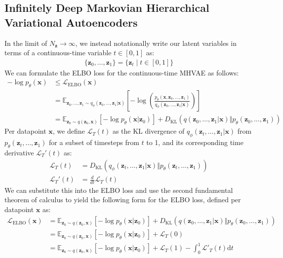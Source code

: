 \documentclass[ oneside,%
                    author={George Herbert},
                    degree={MSci},
                     title={Diffusion Models for Time-Evolving Precipitation Fields},
                  subtitle={}]{dissertation}
\begin{document}
\subsection{Infinitely Deep Markovian Hierarchical Variational Autoencoders}
\label{sec:background_vae_infinite}

In the limit of $N_\mathbf{z}\to\infty$, we instead notationally write our latent variables in terms of a continuous-time variable $t\in[0,1]$ as:
\begin{align}
      \{\mathbf{z}_0,\ldots,\mathbf{z}_1\}=\{\mathbf{z}_t\mid t\in[0,1]\}
\end{align}
We can formulate the ELBO loss for the continuous-time MHVAE as follows:
\begin{align}
      -\log p_\theta(\mathbf{x})&\le \mathcal{L}_{\mathrm{ELBO}}(\mathbf{x})\\
      &=\mathbb{E}_{\mathbf{z}_0,\ldots,\mathbf{z}_1\sim q_\phi(\mathbf{z}_0,\ldots,\mathbf{z}_1|\mathbf{x})}\left[-\log\left(\frac{p_\theta(\mathbf{x},\mathbf{z}_0,\ldots,\mathbf{z}_1)}{q_\phi(\mathbf{z}_0,\ldots,\mathbf{z}_1|\mathbf{x})}\right) \right]\\
      &=\mathbb{E}_{\mathbf{z}_0\sim q(\mathbf{z}_0,\mathbf{x})}\left[-\log p_\theta(\mathbf{x}|\mathbf{z}_0)\right]+D_{\mathrm{KL}}(q(\mathbf{z}_0,\ldots,\mathbf{z}_1|\mathbf{x})\Vert p_\theta (\mathbf{z}_0,\ldots,\mathbf{z}_1))
\end{align}
Per datapoint $\mathbf{x}$, we define $\mathcal{L}_T(t)$ as the KL divergence of $q_\phi(\mathbf{z}_t,\ldots,\mathbf{z}_1|\mathbf{x})$ from $p_\theta(\mathbf{z}_t,\ldots,\mathbf{z}_1)$ for a subset of timesteps from $t$ to 1, and its corresponding time derivative $\mathcal{L}_T'(t)$ as:
\begin{align}
      \mathcal{L}_T(t)&=D_{\mathrm{KL}}(q_\phi(\mathbf{z}_t,\ldots,\mathbf{z}_1|\mathbf{x})\Vert p_\theta(\mathbf{z}_t,\ldots,\mathbf{z}_1))\label{eq:dkl_t}\\
      \mathcal{L}_T'(t)&=\frac{d}{dt}\mathcal{L}_T(t)
\end{align}
We can substitute this into the ELBO loss and use the second fundamental theorem of calculus to yield the following form for the ELBO loss, defined per datapoint $\mathbf{x}$ as:
\begin{align}
      \mathcal{L}_{\mathrm{ELBO}}(\mathbf{x})&=\mathbb{E}_{\mathbf{z}_0\sim q(\mathbf{z}_0,\mathbf{x})}\left[-\log p_\theta(\mathbf{x}|\mathbf{z}_0)\right]+D_{\mathrm{KL}}(q(\mathbf{z}_0,\ldots,\mathbf{z}_1|\mathbf{x})\Vert p_\theta (\mathbf{z}_0,\ldots,\mathbf{z}_1))\\
      &=\mathbb{E}_{\mathbf{z}_0\sim q(\mathbf{z}_0,\mathbf{x})}\left[-\log p_\theta(\mathbf{x}|\mathbf{z}_0)\right]+\mathcal{L}_T(0)\\
      &=\mathbb{E}_{\mathbf{z}_0\sim q(\mathbf{z}_0,\mathbf{x})}\left[-\log p_\theta(\mathbf{x}|\mathbf{z}_0)\right]+\mathcal{L}_T(1)-\int_0^1\mathcal{L}'_T(t)\mathrm{d}t \label{eq:elbo_mhvae}
\end{align}
\end{document}
